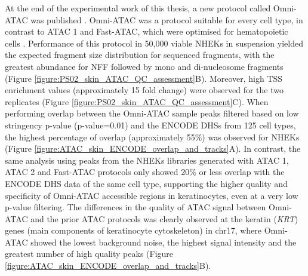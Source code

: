 At the end of the experimental work of this thesis, a new protocol called Omni-ATAC was published \parencite{Corces2017}. Omni-ATAC was a protocol suitable for every cell type, in contrast to ATAC 1 and Fast-ATAC, which were optimised for hematopoietic cells \parencite{Buenrostro2013,Corces2016}. Performance of this protocol in 50,000 viable NHEKs in suspension yielded the expected fragment size distribution for sequenced fragments, with the greatest abundance for NFF followed by mono and di-nucleosome fragments (Figure \ref{figure:PS02_skin_ATAC_QC_assessment}B). Moreover, high TSS enrichment values (approximately 15 fold change) were observed for the two replicates (Figure \ref{figure:PS02_skin_ATAC_QC_assessment}C). When performing overlap between the Omni-ATAC sample peaks filtered based on low stringency p-value (p-value=0.01) and the ENCODE DHSs from 125 cell types, the highest percentage of overlap (approximately 55\%) was observed for NHEKs (Figure \ref{figure:ATAC_skin_ENCODE_overlap_and_tracks}A). In contrast, the same analysis using peaks from the NHEKs libraries generated with ATAC 1, ATAC 2 and Fast-ATAC protocols only showed 20\% or less overlap with the ENCODE DHS data of the same cell type, supporting the higher quality and specificity of Omni-ATAC accessible regions in keratinocytes, even at a very low p-value filtering. The differences in the quality of ATAC signal between Omni-ATAC and the prior ATAC protocols was clearly observed at the keratin (\textit{KRT}) genes (main components of keratinocyte cytoskeleton) in chr17, where Omni-ATAC showed the lowest background noise, the highest signal intensity and the greatest number of high quality peaks (Figure \ref{figure:ATAC_skin_ENCODE_overlap_and_tracks}B). 

